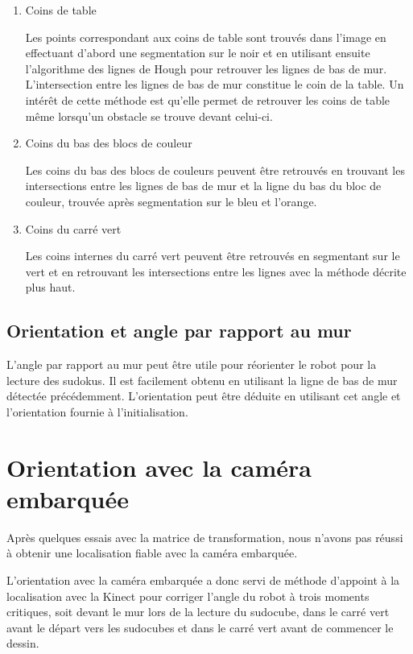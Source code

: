 \begin{enumerate}
\item{Coins de table}

Les points correspondant aux coins de table sont trouvés dans l'image en effectuant d'abord une segmentation sur le noir et en utilisant ensuite l'algorithme des lignes de Hough pour retrouver les lignes de bas de mur. L'intersection entre les lignes de bas de mur constitue le coin de la table. Un intérêt de cette méthode est qu'elle permet de retrouver les coins de table même lorsqu'un obstacle se trouve devant celui-ci.

\item{Coins du bas des blocs de couleur}

Les coins du bas des blocs de couleurs peuvent être retrouvés en trouvant les intersections entre les lignes de bas de mur et la ligne du bas du bloc de couleur, trouvée après segmentation sur le bleu et l'orange.

\item{Coins du carré vert}

Les coins internes du carré vert peuvent être retrouvés en segmentant sur le vert et en retrouvant les intersections entre les lignes avec la méthode décrite plus haut.
\end{enumerate}

\subsection{Orientation et angle par rapport au mur}

L'angle par rapport au mur peut être utile pour réorienter le robot pour la lecture des sudokus. Il est facilement obtenu en utilisant la ligne de bas de mur détectée précédemment. L'orientation peut être déduite en utilisant cet angle et l'orientation fournie à l'initialisation.

\section{Orientation avec la caméra embarquée}

Après quelques essais avec la matrice de transformation, nous n'avons pas réussi à obtenir une localisation fiable avec la caméra embarquée. 

L'orientation avec la caméra embarquée a donc servi de méthode d'appoint à la localisation avec la Kinect pour corriger l'angle du robot à trois moments critiques, soit devant le mur lors de la lecture du sudocube, dans le carré vert avant le départ vers les sudocubes et dans le carré vert avant de commencer le dessin. 

